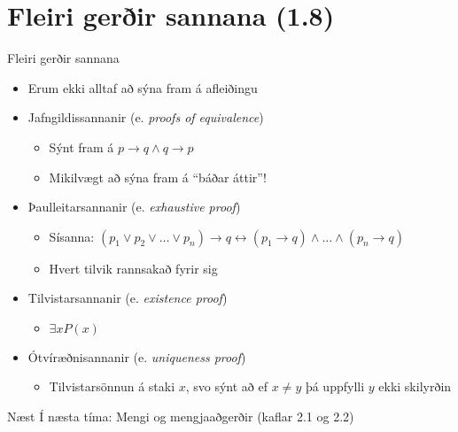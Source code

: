 \documentclass{beamer}
\begin{document}
\section{Fleiri gerðir sannana (1.8)}

\begin{frame}{Fleiri gerðir sannana}
    \begin{itemize}
        \item Erum ekki alltaf að sýna fram á afleiðingu
        \item Jafngildissannanir (e. \emph{proofs of equivalence})
        \begin{itemize}
            \item Sýnt fram á $p \to q \land q \to p$
            \item Mikilvægt að sýna fram á ``báðar áttir''!
        \end{itemize}
        \item Þaulleitarsannanir (e. \emph{exhaustive proof})
        \begin{itemize}
            \item Sísanna: $(p_1 \lor p_2 \lor \ldots \lor p_n) \to q \leftrightarrow (p_1 \to q) \land \ldots \land (p_n \to q)$
            \item Hvert tilvik rannsakað fyrir sig
        \end{itemize}
        \item Tilvistarsannanir (e. \emph{existence proof})
        \begin{itemize}
            \item $\exists x P(x)$
        \end{itemize}
        \item Ótvíræðnisannanir (e. \emph{uniqueness proof})
        \begin{itemize}
            \item Tilvistarsönnun á staki $x$, svo sýnt að ef $x \neq y$ þá uppfylli $y$ ekki skilyrðin
        \end{itemize}
    \end{itemize}
\end{frame}

\begin{frame}{Næst}
Í næsta tíma: Mengi og mengjaaðgerðir (kaflar 2.1 og 2.2)
\end{frame}
\end{document}
